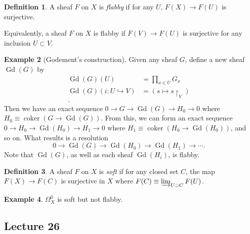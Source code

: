\documentclass[10pt,letterpaper,cm]{nupset}
\theoremstyle{definition}
\newtheorem{definition}{Definition}[subsection]
\newtheorem{exmp}[definition]{Example}
\theoremstyle{theorem}
\theoremstyle{remark}
\newcommand{\1}{\mathbb{1}}
\newcommand{\0}{\vec 0}
\DeclareMathOperator{\Gd}{Gd}
\DeclareMathOperator{\coker}{coker}
\begin{document}
\begin{definition}
A sheaf $F$ on $X$ is \textit{flabby} if for any $U$, $F(X) \to F(U)$ is surjective. 
\end{definition}

Equivalently, a sheaf $F$ on $X$ is flabby if $F(V) \to F(U)$ is surjective for any inclusion $U \subset V$.

\begin{exmp}[Godement's construction]
Given any sheaf $G$, define a new sheaf $\Gd(G)$ by 
\begin{align*}
\Gd(G)(U) & =  \prod_{x\in U}G_x
\\
\Gd(G)(i : U \hookrightarrow V) & = \left(s \mapsto s \restriction_V\right)\\ 
.\end{align*} Then we have an exact sequence $0 \to G \to \Gd(G) \to H_0 \to 0$ where $H_0 \equiv \coker(G \to \Gd(G))$. From this, we can form an exact sequence $0 \to H_0 \to \Gd(H_0) \to H_1 \to 0$ where $H_1 \equiv \coker(H_0 \to \Gd(H_0))$, and so on. What results is a resolution $$ 0 \to \Gd(G) \to \Gd(H_0) \to \Gd(H_1) \to \cdots    .$$  Note that $\Gd(G)$, as well as each sheaf $\Gd(H_i)$, is flabby. 
\end{exmp}

\begin{definition}
A sheaf $F$ on $X$ is \textit{soft} if  for any closed set $C$, the map $F(X) \to F(C)$ is surjective in $X$ where $F(C) \equiv \varinjlim_{U \supset C}F(U)$. 
\end{definition}

\begin{exmp}
$\Omega^0_X$ is soft but not flabby. 
\end{exmp}

\subsection{Lecture 26}
\end{document}
